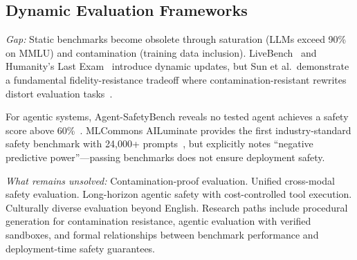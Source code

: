 \subsection{Dynamic Evaluation Frameworks}
\label{sec:future-eval}

\emph{Gap:} Static benchmarks become obsolete through saturation (LLMs exceed 90\% on MMLU) and contamination (training data inclusion). LiveBench~\cite{white2024livebench} and Humanity's Last Exam~\cite{phan2025humanitylastexam} introduce dynamic updates, but Sun et al.\ demonstrate a fundamental fidelity-resistance tradeoff where contamination-resistant rewrites distort evaluation tasks~\cite{sun2025contamination}.

For agentic systems, Agent-SafetyBench reveals no tested agent achieves a safety score above 60\%~\cite{zhang2024agentsafetybench}. MLCommons AILuminate provides the first industry-standard safety benchmark with 24,000+ prompts~\cite{ghosh2024ailuminate}, but explicitly notes ``negative predictive power''---passing benchmarks does not ensure deployment safety.

\emph{What remains unsolved:} Contamination-proof evaluation. Unified cross-modal safety evaluation. Long-horizon agentic safety with cost-controlled tool execution. Culturally diverse evaluation beyond English. Research paths include procedural generation for contamination resistance, agentic evaluation with verified sandboxes, and formal relationships between benchmark performance and deployment-time safety guarantees.
